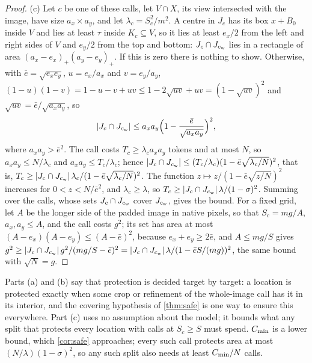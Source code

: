\begin{proof}
(c) Let $c$ be one of these calls, let $V \cap X$, its view intersected with the image, have size $a_x \times a_y$, and let $\lambda_c = S_c^2/m^2$. A centre in $J_c$ has its box $x + B_0$ inside $V$ and lies at least $\tau$ inside $K_c \subseteq V$, so it lies at least $e_x/2$ from the left and right sides of $V$ and $e_y/2$ from the top and bottom: $J_c \cap J_{c_{\mathrm{w}}}$ lies in a rectangle of area $(a_x - e_x)_+(a_y - e_y)_+$. If this is zero there is nothing to show. Otherwise, with $\bar e = \sqrt{e_xe_y}$, $u = e_x/a_x$ and $v = e_y/a_y$, $(1-u)(1-v) = 1 - u - v + uv \le 1 - 2\sqrt{uv} + uv = (1-\sqrt{uv})^2$ and $\sqrt{uv} = \bar e/\sqrt{a_xa_y}$, so
\[
|J_c \cap J_{c_{\mathrm{w}}}| \le a_x a_y\Big(1 - \frac{\bar e}{\sqrt{a_x a_y}}\Big)^2,
\]
where $a_xa_y > \bar e^2$. The call costs $T_c \ge \lambda_c a_xa_y$ tokens and at most $N$, so $a_xa_y \le N/\lambda_c$ and $a_xa_y \le T_c/\lambda_c$; hence $|J_c \cap J_{c_{\mathrm{w}}}| \le (T_c/\lambda_c)(1 - \bar e\sqrt{\lambda_c/N})^2$, that is, $T_c \ge |J_c \cap J_{c_{\mathrm{w}}}|\,\lambda_c/(1 - \bar e\sqrt{\lambda_c/N})^2$. The function $z \mapsto z/(1 - \bar e\sqrt{z/N})^2$ increases for $0 < z < N/\bar e^2$, and $\lambda_c \ge \lambda$, so $T_c \ge |J_c \cap J_{c_{\mathrm{w}}}|\,\lambda/(1-\sigma)^2$. Summing over the calls, whose sets $J_c \cap J_{c_{\mathrm{w}}}$ cover $J_{c_{\mathrm{w}}}$, gives the bound. For a fixed grid, let $A$ be the longer side of the padded image in native pixels, so that $S_c = mg/A$, $a_x, a_y \le A$, and the call costs $g^2$; its set has area at most $(A - e_x)(A - e_y) \le (A - \bar e)^2$, because $e_x + e_y \ge 2\bar e$, and $A \le mg/S$ gives $g^2 \ge |J_c \cap J_{c_{\mathrm{w}}}|\,g^2/(mg/S - \bar e)^2 = |J_c \cap J_{c_{\mathrm{w}}}|\,\lambda/(1 - \bar eS/(mg))^2$, the same bound with $\sqrt N = g$.
\end{proof}

Parts (a) and (b) say that protection is decided target by target: a location is protected exactly when some crop or refinement of the whole-image call has it in its interior, and the covering hypothesis of \cref{thm:safe} is one way to ensure this everywhere. Part (c) uses no assumption about the model; it bounds what any split that protects every location with calls at $S_c \ge S$ must spend. $C_{\min}$ is a lower bound, which \cref{cor:safe} approaches; every such call protects area at most $(N/\lambda)(1-\sigma)^2$, so any such split also needs at least $C_{\min}/N$ calls.

